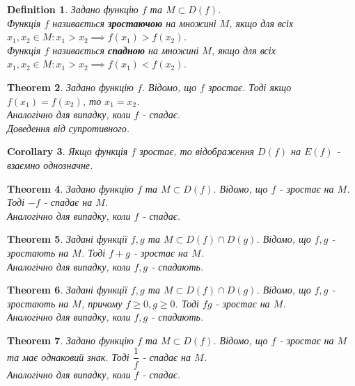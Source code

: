 \documentclass[a4paper, 10pt]{article}
\theoremstyle{theoremdd}
\newtheorem{theorem}{Theorem}[subsection]
\theoremstyle{theoremdd}
\newtheorem{definition}[theorem]{Definition}
\theoremstyle{theoremdd}
\theoremstyle{theoremdd}
\theoremstyle{theoremdd}
\theoremstyle{theoremdd}
\theoremstyle{theoremdd}
\theoremstyle{theoremdd}
\newtheorem{corollary}[theorem]{Corollary}
\begin{document}
\begin{definition}
Задано функцію $f$ та $M \subset D(f)$.\\
Функція $f$ називається \textbf{зростаючою} на множині $M$, якщо для всіх $x_1,x_2 \in M: x_1 > x_2 \implies f(x_1) > f(x_2)$.\\
Функція $f$ називається \textbf{спадною} на множині $M$, якщо для всіх $x_1,x_2 \in M: x_1 > x_2 \implies f(x_1) < f(x_2)$.
\end{definition}

\begin{theorem}
Задано функцію $f$. Відомо, що $f$ зростає. Тоді якщо $f(x_1) = f(x_2)$, то $x_1 = x_2$.\\
\textit{Аналогічно для випадку, коли $f$ - спадає.}\\
\textit{Доведення від супротивного.}
\end{theorem}

\begin{corollary}
Якщо функція $f$ зростає, то відображення $D(f)$ на $E(f)$ - взаємно однозначне.
\end{corollary}

\begin{theorem}
Задано функцію $f$ та $M \subset D(f)$. Відомо, що $f$ - зростає на $M$. Тоді $-f$ - спадає на $M$.\\
\textit{Аналогічно для випадку, коли $f$ - спадає.}
\end{theorem}

\begin{theorem}
Задані функції $f,g$ та $M \subset D(f) \cap D(g)$. Відомо, що $f,g$ - зростають на $M$. Тоді $f+g$ - зростає на $M$.\\
\textit{Аналогічно для випадку, коли $f,g$ - спадають.}
\end{theorem}

\begin{theorem}
Задані функції $f,g$ та $M \subset D(f) \cap D(g)$. Відомо, що $f,g$ - зростають на $M$, причому $f \geq 0, g \geq 0$. Тоді $fg$ - зростає на $M$.\\
\textit{Аналогічно для випадку, коли $f,g$ - спадають.}
\end{theorem}

\begin{theorem}
Задано функцію $f$ та $M \subset D(f)$. Відомо, що $f$ - зростає на $M$ та має однаковий знак. Тоді $\dfrac{1}{f}$ - спадає на $M$.\\
\textit{Аналогічно для випадку, коли $f$ - спадає.}
\end{theorem}
\end{document}
